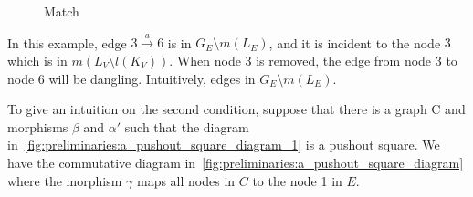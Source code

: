 \begin{figure}[H]
{
        }       
        \caption{Match} 
        \label{fig:preliminaries:a_match_dangling_edge_condition} 
    \end{figure}
 In this example, edge $3 \overset{a}{\rightarrow} 6$ is in $G_E \setminus m(L_E)$, and it is incident to the node $3$ which is in $m(L_V \setminus l(K_V))$. When node $3$ is removed, the edge from node $3$ to node $6$ will be dangling. Intuitively, edges in $G_E \setminus m(L_E)$.

    To give an intuition on the second condition, suppose that there is a graph C and morphisms $\beta$ and $\alpha'$ such that the diagram in~\autoref{fig:preliminaries:a_pushout_square_diagram_1} is a pushout square.
   We have the commutative diagram in~\autoref{fig:preliminaries:a_pushout_square_diagram} where the morphism $\gamma$ maps all nodes in $C$ to the node 1 in $E$.

